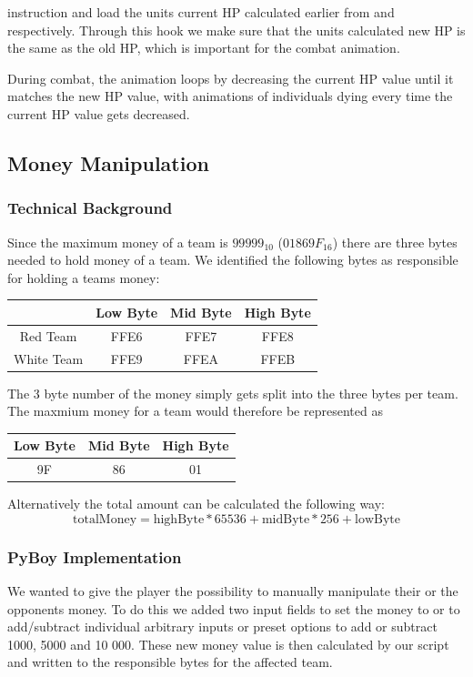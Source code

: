 instruction and load the units current HP calculated earlier from  and  respectively.
Through this hook we make sure that the units calculated new HP is the same as the old HP, which is important for the combat animation.

During combat, the animation loops by decreasing the current HP value until it matches the new HP value, with animations of individuals dying every time the current HP value gets decreased.

\subsection{Money Manipulation}
\subsubsection{Technical Background}

Since the maximum money of a team is $99 999_{10}$ ($01869F_{16}$) there are three bytes needed to hold money of a team.
We identified the following bytes as responsible for holding a teams money:

\begin{tabular}{|c|c|c|c|}
	\hline
	& Low Byte & Mid Byte & High Byte \\
	\hline
	Red Team & FFE6 & FFE7 & FFE8 \\
	\hline
	White Team & FFE9 & FFEA & FFEB \\
	\hline
\end{tabular}

The 3 byte number of the money simply gets split into the three bytes per team. The maxmium money for a team would therefore be represented as

\begin{tabular}{|c|c|c|}
	\hline
	Low Byte & Mid Byte & High Byte \\
	\hline
	9F & 86 & 01 \\
	\hline
\end{tabular}

 Alternatively the total amount can be calculated the following way:
\begin{equation}
	\text{totalMoney} = \text{highByte} * 65 536 + \text{midByte} * 256 + \text{lowByte}
\end{equation}

\subsubsection{PyBoy Implementation}
We wanted to give the player the possibility to manually manipulate their or the opponents money.
To do this we added two input fields to set the money to or to add/subtract individual arbitrary inputs or preset options to add or subtract 1000, 5000 and 10 000.
These new money value is then calculated by our script and written to the responsible bytes for the affected team.


